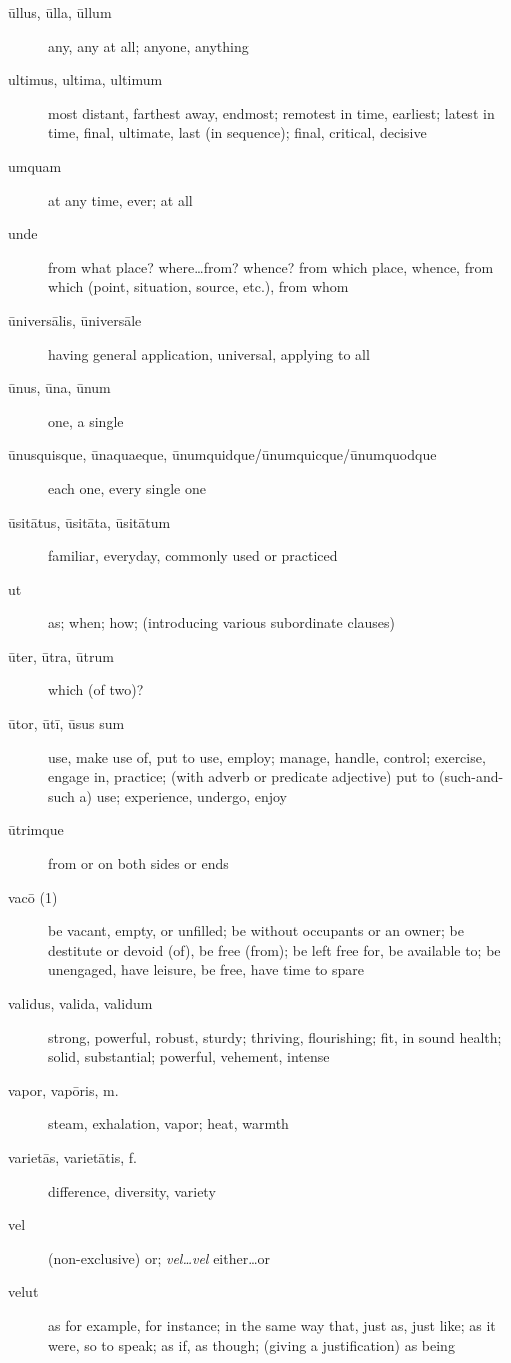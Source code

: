 \begin{description}
    \item[ūllus, ūlla, ūllum] any, any at all; anyone, anything
    \item[ultimus, ultima, ultimum] most distant, farthest away, endmost; remotest in time, earliest; latest in time, final, ultimate, last (in sequence); final, critical, decisive
    \item[umquam] at any time, ever; at all
    \item[unde] from what place? where\dots from? whence? from which place, whence, from which (point, situation, source, etc.), from whom
    \item[ūniversālis, ūniversāle] having general application, universal, applying to all
    \item[ūnus, ūna, ūnum] one, a single
    \item[ūnusquisque, ūnaquaeque, ūnumquidque/ūnumquicque/ūnumquodque] each one, every single one
    \item[ūsitātus, ūsitāta, ūsitātum] familiar, everyday, commonly used or practiced
    \item[ut] as; when; how; (introducing various subordinate clauses)
    \item[ūter, ūtra, ūtrum] which (of two)?
    \item[ūtor, ūtī, ūsus sum] use, make use of, put to use, employ; manage, handle, control; exercise, engage in, practice; (with adverb or predicate adjective) put to (such-and-such a) use; experience, undergo, enjoy
    \item[ūtrimque] from or on both sides or ends
    \item[vacō (1)] be vacant, empty, or unfilled; be without occupants or an owner; be destitute or devoid (of), be free (from); be left free for, be available to; be unengaged, have leisure, be free, have time to spare
    \item[validus, valida, validum] strong, powerful, robust, sturdy; thriving, flourishing; fit, in sound health; solid, substantial; powerful, vehement, intense
    \item[vapor, vapōris, m.] steam, exhalation, vapor; heat, warmth
    \item[varietās, varietātis, f.] difference, diversity, variety
    \item[vel] (non-exclusive) or; \textit{vel\dots vel} either\dots or
    \item[velut] as for example, for instance; in the same way that, just as, just like; as it were, so to speak; as if, as though; (giving a justification) as being

\end{description}
